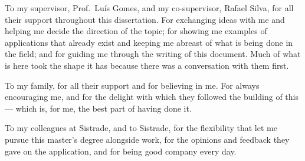 \begin{acknowledgements}
To my supervisor, Prof.\ Luís Gomes, and my co-supervisor, Rafael Silva, for all their support
throughout this dissertation. For exchanging ideas with me and helping me decide the direction of
the topic; for showing me examples of applications that already exist and keeping me abreast of what
is being done in the field; and for guiding me through the writing of this document. Much of what is
here took the shape it has because there was a conversation with them first.

To my family, for all their support and for believing in me. For always encouraging me, and for the
delight with which they followed the building of this --- which is, for me, the best part of having
done it.

To my colleagues at Sistrade, and to Sistrade, for the flexibility that let me pursue this master's
degree alongside work, for the opinions and feedback they gave on the application, and for being
good company every day.

\end{acknowledgements}


\tableofcontents %

\listoffigures %

\listoftables %

\listofalgorithms %
\addchaptertocentry{\listalgorithmname}


